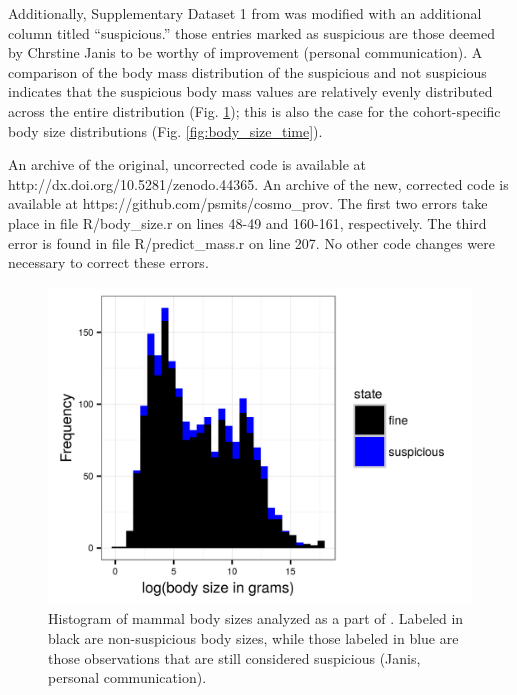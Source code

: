 \documentclass{article}
\begin{document}
Additionally, Supplementary Dataset 1 from \citet{Smits2015} was modified with an additional column titled ``suspicious.'' those entries marked as suspicious are those deemed by Chrstine Janis to be worthy of improvement (personal communication). A comparison of the body mass distribution of the suspicious and not suspicious indicates that the suspicious body mass values are relatively evenly distributed across the entire distribution (Fig. \ref{fig:body_size}); this is also the case for the cohort-specific body size distributions (Fig. \ref{fig:body_size_time}).

An archive of the original, uncorrected code is available at http://dx.doi.org/10.5281/zenodo.44365. An archive of the new, corrected code is available at https://github.com/psmits/cosmo\_prov. The first two errors take place in file R/body\_size.r on lines 48-49 and 160-161, respectively. The third error is found in file R/predict\_mass.r on line 207. No other code changes were necessary to correct these errors.


\begin{figure}[ht]
  \centering
  \includegraphics[height=0.4\textheight, width=\textwidth, keepaspectratio=true]{figure/body_size_compare}
  \caption{Histogram of mammal body sizes analyzed as a part of \citet{Smits2015}. Labeled in black are non-suspicious body sizes, while those labeled in blue are those observations that are still considered suspicious (Janis, personal communication).}
  \label{fig:body_size}
\end{figure}
\end{document}
